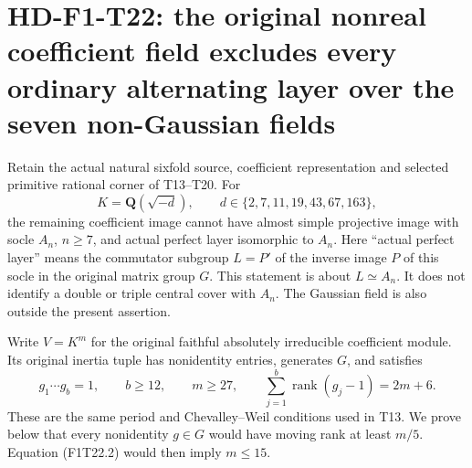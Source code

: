 \section[HD-F1-T22: ordinary alternating layers over the seven non-Gaussian fields]{HD-F1-T22: the original nonreal coefficient field excludes every ordinary alternating layer over the seven non-Gaussian fields}
\label{sec:f1-ordinary-alternating-source}

Retain the actual natural sixfold source, coefficient representation
and selected primitive rational corner of T13--T20. For
\[
 K=\mathbf Q(\sqrt{-d}),\qquad
 d\in\{2,7,11,19,43,67,163\},
 \tag{F1T22.1}
\]
the remaining coefficient image cannot have almost simple
projective image with socle \(A_n\), \(n\ge7\), and
actual perfect layer isomorphic to \(A_n\).
Here ``actual perfect layer'' means the commutator subgroup
\(L=P'\) of the inverse image \(P\) of this socle in
the original matrix group \(G\). This statement is about
\(L\simeq A_n\). It does not identify a double or triple
central cover with \(A_n\). The Gaussian field is also
outside the present assertion.

Write \(V=K^m\) for the original faithful absolutely
irreducible coefficient module. Its original inertia tuple
has nonidentity entries, generates \(G\), and satisfies
\[
 g_1\cdots g_b=1,\qquad b\ge12,\qquad m\ge27,
 \qquad\sum_{j=1}^b\operatorname{rank}(g_j-1)=2m+6.
 \tag{F1T22.2}
\]
These are the same period and Chevalley--Weil conditions
used in T13. We prove below that every nonidentity
\(g\in G\) would have moving rank at least \(m/5\).
Equation (F1T22.2) would then imply \(m\le15\).

